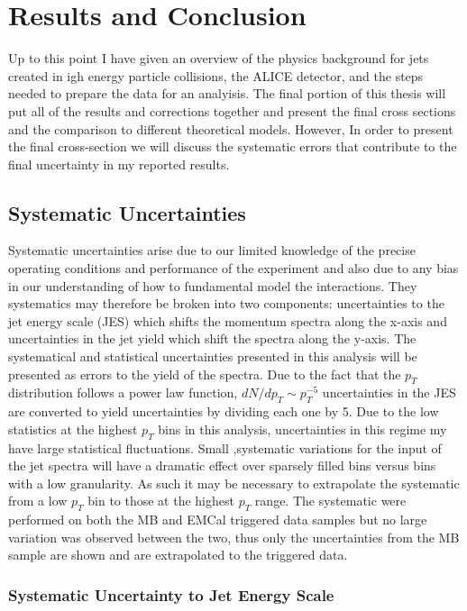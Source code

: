\chapter{Results and Conclusion} \label{ch:cando}

Up to this point I have given an overview of the physics background for jets created in igh energy particle collisions, the ALICE detector, and the steps needed to prepare the data for an analyisis.  The final portion of this thesis will put all of the results and corrections together and present the final cross sections and the comparison to different theoretical models.  However, In order to present the final cross-section we will discuss the systematic errors that contribute to the final uncertainty in my reported results.

\section{Systematic Uncertainties}

Systematic uncertainties arise due to our limited knowledge of the precise operating conditions and performance of the experiment and also due to any bias in our understanding of how to fundamental model the interactions.  They systematics may therefore be broken into two components: uncertainties to the jet energy scale (JES) which shifts the momentum spectra along the x-axis and uncertainties in the jet yield which shift the spectra along the y-axis.  The systematical and statistical uncertainties presented in this analysis will be presented as errors to the yield of the spectra.  Due to the fact that the $p_{T}$ distribution follows a power law function, $dN/dp_{T} \sim p_{T}^{-5}$ uncertainties in the JES are converted to yield uncertainties by dividing each one by 5.
Due to the low statistics at the highest $p_{T}$ bins in this analysis, uncertainties in this regime my have large statistical fluctuations.  Small ,systematic variations for the input of the jet spectra will have a dramatic effect over sparsely filled bins versus bins with a low granularity.  As such it may be necessary to extrapolate the systematic from a low $p_{T}$ bin to those at the highest $p_{T}$ range.  The systematic were performed on both the MB and EMCal triggered data samples but no large variation was observed between the two, thus only the uncertainties from the MB sample are shown and are extrapolated to the triggered data.


\subsection{Systematic Uncertainty to Jet Energy Scale}

